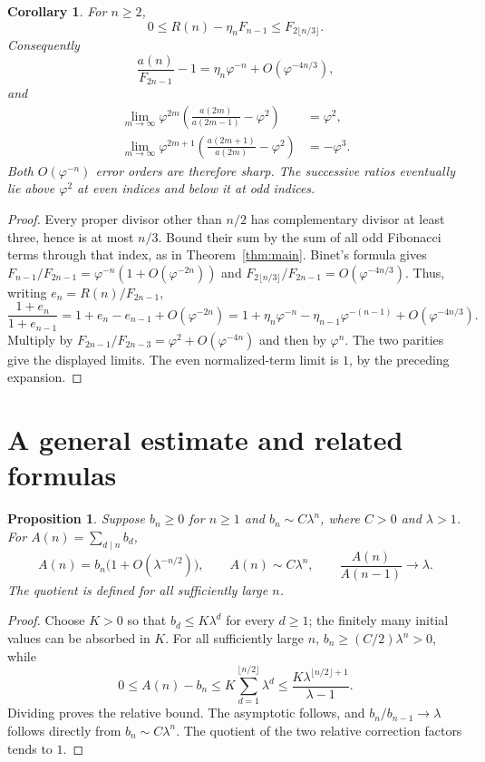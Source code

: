 \documentclass[11pt]{article}
\newtheorem{proposition}[theorem]{Proposition}
\newtheorem{corollary}[theorem]{Corollary}
\newcommand{\ph}{\varphi}
\begin{document}
\begin{corollary}\label{cor:sharp}
For $n\geq2$,
\[
0\leq R(n)-\eta_n F_{n-1}\leq F_{2\lfloor n/3\rfloor}.
\]
Consequently
\[
\frac{a(n)}{F_{2n-1}}-1
=\eta_n\ph^{-n}+O(\ph^{-4n/3}),
\]
and
\begin{align*}
\lim_{m\to\infty}\ph^{2m}
 \left(\frac{a(2m)}{a(2m-1)}-\ph^2\right)&=\ph^2,\\
\lim_{m\to\infty}\ph^{2m+1}
 \left(\frac{a(2m+1)}{a(2m)}-\ph^2\right)&=-\ph^3.
\end{align*}
Both $O(\ph^{-n})$ error orders are therefore sharp. The successive
ratios eventually lie above $\ph^2$ at even indices and below it at
odd indices.
\end{corollary}
\begin{proof}
Every proper divisor other than $n/2$ has complementary divisor at
least three, hence is at most $n/3$. Bound their sum by the sum of all
odd Fibonacci terms through that index, as in Theorem~\ref{thm:main}.
Binet's formula gives
$F_{n-1}/F_{2n-1}=\ph^{-n}(1+O(\ph^{-2n}))$ and
$F_{2\lfloor n/3\rfloor}/F_{2n-1}=O(\ph^{-4n/3})$.
Thus, writing $e_n=R(n)/F_{2n-1}$,
\[
\frac{1+e_n}{1+e_{n-1}}
=1+e_n-e_{n-1}+O(\ph^{-2n})
=1+\eta_n\ph^{-n}-\eta_{n-1}\ph^{-(n-1)}
 +O(\ph^{-4n/3}).
\]
Multiply by $F_{2n-1}/F_{2n-3}=\ph^2+O(\ph^{-4n})$ and
then by $\ph^n$. The two parities give the displayed limits.
The even normalized-term limit is $1$, by the preceding expansion.
\end{proof}

\section{A general estimate and related formulas}
\begin{proposition}\label{prop:general}
Suppose $b_n\geq0$ for $n\geq1$ and $b_n\sim C\lambda^n$, where
$C>0$ and $\lambda>1$. For $A(n)=\sum_{d\mid n}b_d$,
\[
 A(n)=b_n\bigl(1+O(\lambda^{-n/2})\bigr),\qquad
 A(n)\sim C\lambda^n,\qquad
 \frac{A(n)}{A(n-1)}\longrightarrow\lambda.
\]
The quotient is defined for all sufficiently large $n$.
\end{proposition}
\begin{proof}
Choose $K>0$ so that $b_d\leq K\lambda^d$ for every $d\geq1$;
the finitely many initial values can be absorbed in $K$.
For all sufficiently large $n$, $b_n\geq (C/2)\lambda^n>0$, while
\[
 0\leq A(n)-b_n\leq K\sum_{d=1}^{\lfloor n/2\rfloor}\lambda^d
 \leq\frac{K\lambda^{\lfloor n/2\rfloor+1}}{\lambda-1}.
\]
Dividing proves the relative bound. The asymptotic follows, and
$b_n/b_{n-1}\to\lambda$ follows directly from $b_n\sim C\lambda^n$.
The quotient of the two relative correction factors tends to $1$.
\end{proof}
\end{document}
